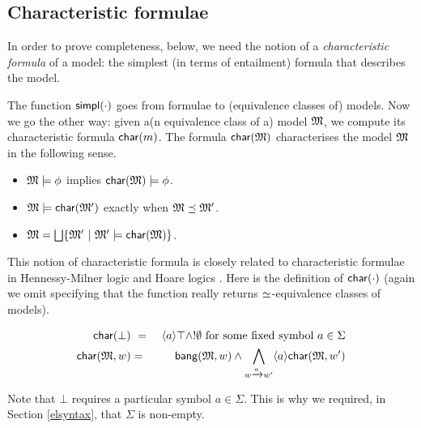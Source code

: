 \subsection{Characteristic formulae}

In order to prove completeness, below, we need the notion of a \emph{characteristic formula} of a model: the simplest (in terms of entailment) formula that describes the model.

The function $\mathsf{simpl}(\cdot)$ goes from formulae to (equivalence
classes of) models. Now we go the other way: given a(n equivalence class of a) model $\frak{M}$, we
compute its characteristic formula $\mathsf{char}(m)$. The formula
$\mathsf{char}(\frak{M})$ characterises the model $\frak{M}$ in the following
sense. 

\begin{itemize}

\item  $\frak{M} \models \phi$ implies $\mathsf{char}(\frak{M}) \models \phi$.

\item  $\frak{M} \models \mathsf{char}( \frak{M}' )$ exactly when $\frak{M} \preceq \frak{M}'$.

\item $\frak{M} = \bigsqcup \{\frak{M}' \ |\ \frak{M}' \models \mathsf{char}(\frak{M}) \}$.

\end{itemize}


\NI This notion of characteristic formula is closely related to
characteristic formulae in Hennessy-Milner logic
\cite{AcetoL:chaforfata} and Hoare logics
\cite{HondaK:descriptive,ChargueraudA:provertcf}. Here is the
definition of $\mathsf{char}(\cdot)$ (again we omit specifying that the function really
returns $\simeq$-equivalence classes of models).

\begin{eqnarray*}
  \mathsf{char}(\bot) &\ =\ & \langle a \rangle \top \land ! \emptyset  \mbox{ for some fixed symbol }a \in \Sigma  \\
  \mathsf{char}(\frak{M}, w) & = & \mathsf{bang}(\frak{M},w) \land \bigwedge_{w \xrightarrow{a} w'} \langle a \rangle \mathsf{char}(\frak{M}, w')  
\end{eqnarray*}

\NI Note that $\bot$ requires a particular symbol $a \in \Sigma$. This is why we required, in Section \ref{elsyntax}, that $\Sigma$ is non-empty.

